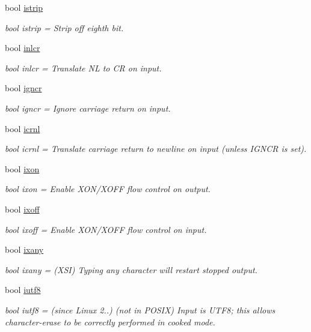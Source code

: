 \begin{DoxyCompactItemize}
bool \hyperlink{classport_1_1inFlags_a73a9e0705199e32a3b3cce9aa8d8c6e0}{istrip}
\begin{DoxyCompactList}\small\item\em bool istrip = Strip off eighth bit. \end{DoxyCompactList}\item 
bool \hyperlink{classport_1_1inFlags_a934afcf2cf7cf062762fb7dac1cbadc5}{inlcr}
\begin{DoxyCompactList}\small\item\em bool inlcr = Translate NL to CR on input. \end{DoxyCompactList}\item 
bool \hyperlink{classport_1_1inFlags_ae51c5a4ba8887f6d52e3f868e7bf341c}{igncr}
\begin{DoxyCompactList}\small\item\em bool igncr = Ignore carriage return on input. \end{DoxyCompactList}\item 
bool \hyperlink{classport_1_1inFlags_aa2d6f6ad81fcb7e8e9516f62289f605f}{icrnl}
\begin{DoxyCompactList}\small\item\em bool icrnl = Translate carriage return to newline on input (unless I\+G\+N\+CR is set). \end{DoxyCompactList}\item 
bool \hyperlink{classport_1_1inFlags_a721d59e230e1d380883557baca1af9dc}{ixon}
\begin{DoxyCompactList}\small\item\em bool ixon = Enable X\+O\+N/\+X\+O\+FF flow control on output. \end{DoxyCompactList}\item 
bool \hyperlink{classport_1_1inFlags_ac62b0bf89cf9133983b14a850e41b14d}{ixoff}
\begin{DoxyCompactList}\small\item\em bool ixoff = Enable X\+O\+N/\+X\+O\+FF flow control on input. \end{DoxyCompactList}\item 
bool \hyperlink{classport_1_1inFlags_a3ee201d186e1037b5c8df599c737b251}{ixany}
\begin{DoxyCompactList}\small\item\em bool ixany = (X\+SI) Typing any character will restart stopped output. \end{DoxyCompactList}\item 
bool \hyperlink{classport_1_1inFlags_af4f6bd13e2baf854c3b750f8b765ac42}{iutf8}
\begin{DoxyCompactList}\small\item\em bool iutf8 = (since Linux 2..) (not in P\+O\+S\+IX) Input is U\+T\+F8; this allows character-\/erase to be correctly performed in cooked mode. \end{DoxyCompactList}\end{DoxyCompactItemize}


